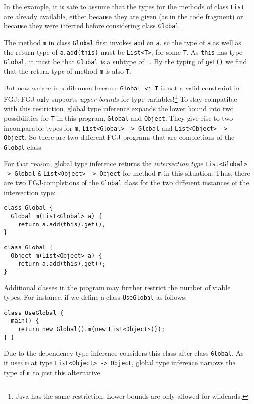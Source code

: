 In the example, it is safe to assume that the types for the methods of class \texttt{List}
are already available, either because they are given (as in the code
fragment) or because they were inferred before considering class \texttt{Global}.

The method \texttt{m} in class \texttt{Global} first invokes
\texttt{add} on \texttt{a}, so the type of \texttt{a} as well as the
return type of \texttt{a.add(this)} must be
\texttt{List<T>}, for some \texttt{T}. As \texttt{this} has
type \texttt{Global}, it must be that \texttt{Global} is a
subtype of \texttt{T}. By the typing of \texttt{get()} we find that
the return type of method \texttt{m} is also \texttt{T}.

But now we are in a dilemma because \texttt{Global <: T} is not a
valid constraint in FGJ: FGJ only supports \emph{upper bounds} for
type variables!\footnote{Java has the same restriction. Lower bounds
  are only allowed for wildcards.}
To stay compatible with this restriction, global type inference
expands the lower bound into two possibilities for
\texttt{T} in this program, \texttt{Global} and
\texttt{Object}.  They give rise to two incomparable types for
\texttt{m}, \texttt{List<Global> -> Global} and
\texttt{List<Object> -> Object}. So there are two different FGJ
programs that are completions of the \texttt{Global} class.

For that reason, global type inference returns the \emph{intersection type}
\texttt{List<Global> -> Global} \verb!&! \texttt{List<Object> -> Object}
for method \texttt{m} in this situation. Thus, there are two
FGJ-completions of the \texttt{Global} class for the two different
instances of the intersection type:
\begin{center}
  \begin{minipage}{0.49\linewidth}
\begin{lstlisting}
class Global {
  Global m(List<Global> a) {
    return a.add(this).get();
}
\end{lstlisting}
  \end{minipage}
  \begin{minipage}{0.49\linewidth}
\begin{lstlisting}
class Global {
  Object m(List<Object> a) {
    return a.add(this).get();
}
\end{lstlisting}
  \end{minipage}
\end{center}
Additional classes in the program may further restrict the number of
viable types. For instance, if we define a class \texttt{UseGlobal} as
follows:
\begin{lstlisting}
class UseGlobal {
  main() {
    return new Global().m(new List<Object>());
} }
\end{lstlisting}
Due to the dependency type inference considers this class after class
\texttt{Global}. As it uses \texttt{m} at type
\texttt{List<Object> -> Object}, global type inference narrows the
type of \texttt{m} to just this alternative.

